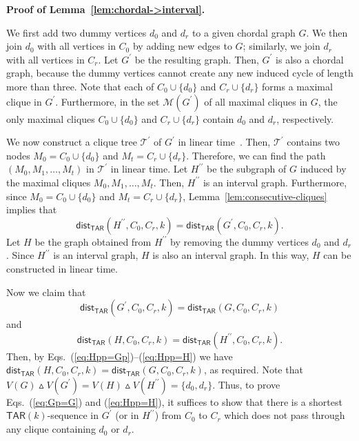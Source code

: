 \documentclass{llncs}
\newcommand{\TAR}[1]{\mathsf{TAR}(#1)}
\newcommand{\symdiff}[2]{#1 \vartriangle #2}
\newcommand{\ini}{0}
\newcommand{\tar}{r}
\newcommand{\cliq}{C}
\newcommand{\distTARG}[4]{\mathsf{dist_{TAR}}(#1,#2,#3,#4)}
\newcommand{\Mset}[1]{\mathcal{M}(#1)}
\newcommand{\subH}{H}
\newcommand{\dumo}{d_{\ini}}
\newcommand{\dumt}{d_{\tar}}
\newcounter{two}
\newcounter{three}
\begin{document}
\noindent
	{\bf Proof of Lemma~\ref{lem:chordal->interval}.}

We first add two dummy vertices $\dumo$ and $\dumt$ to a given chordal graph $G$.
	We then join $\dumo$ with all vertices in $\cliq_{\ini}$ by adding new edges to $G$;
similarly, we join $\dumt$ with all vertices in $\cliq_{\tar}$.
	Let $G^\prime$ be the resulting graph.
	Then, $G^\prime$ is also a chordal graph, because the dummy vertices cannot create any new induced cycle of length more than three.
	Note that each of $\cliq_{\ini} \cup \{\dumo\}$ and $\cliq_{\tar} \cup \{\dumt\}$ forms a maximal clique in $G^\prime$.
	Furthermore, in the set $\Mset{G^\prime}$ of all maximal cliques in $G$, the only maximal cliques $\cliq_{\ini} \cup \{\dumo\}$ and $\cliq_{\tar} \cup \{\dumt\}$ contain $\dumo$ and $\dumt$, respectively. 
	
	We now construct a clique tree $\mathcal{T}^\prime$ of $G^\prime$ in linear time~\cite[\S 15.1]{Spinrad03}.
	Then, $\mathcal{T}^\prime$ contains two nodes $M_0 = \cliq_{\ini} \cup \{\dumo\}$ and $M_t = \cliq_{\tar} \cup \{\dumt\}$.
	Therefore, we can find the path $(M_{0}, M_1, \ldots, M_{t})$ in $\mathcal{T}^\prime$ in linear time.
	Let $H^{\prime \prime}$ be the subgraph of $G$ induced by the maximal cliques $M_{0}, M_1, \ldots, M_{t}$.
	Then, $H^{\prime \prime}$ is an interval graph. 
	Furthermore, since $M_0 = \cliq_{\ini} \cup \{\dumo\}$ and $M_t = \cliq_{\tar} \cup \{\dumt\}$, Lemma~\ref{lem:consecutive-cliques} implies that 
	\begin{equation} \label{eq:Hpp=Gp}
		\distTARG{H^{\prime \prime}}{\cliq_{\ini}}{\cliq_{\tar}}{k} = \distTARG{G^\prime}{\cliq_{\ini}}{\cliq_{\tar}}{k}.
	\end{equation}
	Let $\subH$ be the graph obtained from $H^{\prime \prime}$ by removing the dummy vertices $\dumo$ and $\dumt$.
	Since $H^{\prime \prime}$ is an interval graph, $H$ is also an interval graph.
	In this way, $\subH$ can be constructed in linear time. 
	
	Now we claim that 
	\begin{equation} \label{eq:Gp=G}
		\distTARG{G^\prime}{\cliq_{\ini}}{\cliq_{\tar}}{k} = \distTARG{G}{\cliq_{\ini}}{\cliq_{\tar}}{k}
	\end{equation}
and
	\begin{equation} \label{eq:Hpp=H}
		\distTARG{\subH}{\cliq_{\ini}}{\cliq_{\tar}}{k} = \distTARG{H^{\prime \prime}}{\cliq_{\ini}}{\cliq_{\tar}}{k}.
	\end{equation}
	Then, by Eqs.~(\ref{eq:Hpp=Gp})--(\ref{eq:Hpp=H}) we have $\distTARG{\subH}{\cliq_{\ini}}{\cliq_{\tar}}{k} = \distTARG{G}{\cliq_{\ini}}{\cliq_{\tar}}{k}$, as required.
	Note that $\symdiff{V(G)}{V(G^\prime)} = \symdiff{V(\subH)}{V(H^{\prime\prime})} = \{\dumo, \dumt\}$.
	Thus, to prove Eqs.~(\ref{eq:Gp=G}) and (\ref{eq:Hpp=H}), it suffices to show that there is a shortest $\TAR{k}$-sequence in $G^\prime$ (or in $H^{\prime \prime}$) from $\cliq_{\ini}$ to $\cliq_{\tar}$ which does not pass through any clique containing $\dumo$ or $\dumt$.   
	
\end{document}
